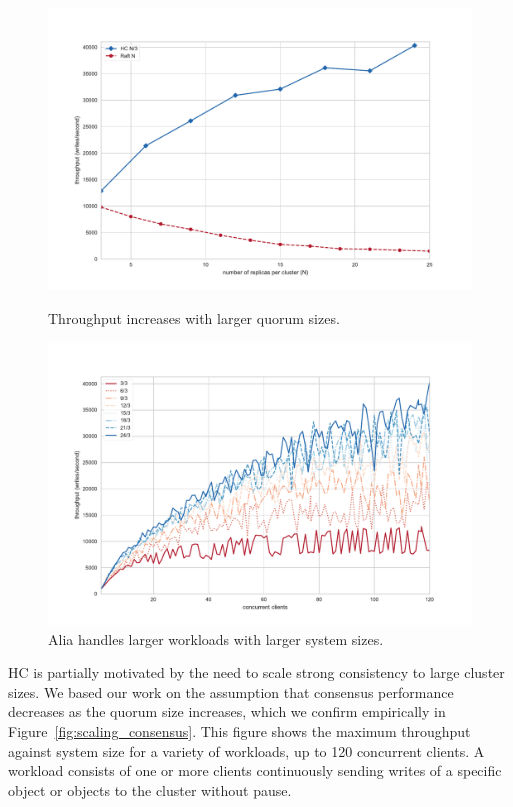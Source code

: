 \documentclass[10pt,conference]{IEEEtran}
\begin{document}
\begin{figure}[t]
    \centering
        \includegraphics[width=\linewidth]{figures/scaling.pdf}
        \caption{Throughput increases with larger quorum sizes.}
        \label{fig:scaling_consensus}
    \endminipage\hfill
        \includegraphics[width=\linewidth]{figures/hc_throughput_workload.pdf}
        \caption{Alia handles larger workloads with larger system sizes.}
        \label{fig:throughput_workload}
    \endminipage
\end{figure}

HC is partially motivated by the need to scale strong consistency to large cluster sizes.
We based our work on the assumption that consensus performance decreases as the quorum
size increases, which we confirm empirically in Figure~\ref{fig:scaling_consensus}.
This figure shows the maximum throughput against system size for a variety of workloads,
up to 120 concurrent clients.
A workload consists of one or more clients continuously sending writes of a specific
object or objects to the cluster without pause.
\end{document}
